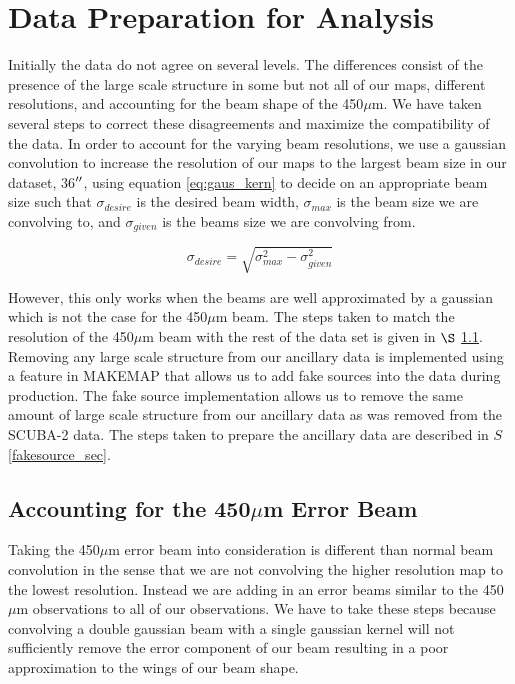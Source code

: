 \section{Data Preparation for Analysis}

Initially the data do not agree on several levels.  The differences consist of the presence of the large scale structure in some but not all of our maps, different resolutions, and accounting for the beam shape of the 450$\mu$m.  We have taken several steps to correct these disagreements and maximize the compatibility of the data.  In order to account for the varying beam resolutions, we use a gaussian convolution to increase the resolution of our maps to the largest beam size in our dataset, 36$\mbox{$^{\prime\prime}$}$, using equation \ref{eq:gaus_kern} to decide on an appropriate beam size such that $\sigma_{desire}$ is the desired beam width, $\sigma_{max}$ is the beam size we are convolving to, and $\sigma_{given}$ is the beams size we are convolving from.

\begin{equation}\label{eq:gaus_kern}
  \sigma_{desire} = \sqrt{\sigma_{max}^2 - \sigma_{given}^2}
\end{equation}

However, this only works when the beams are well approximated by a gaussian which is not the case for the 450$\mu$m beam.  The steps taken to match the resolution of the 450$\mu$m beam with the rest of the data set is given in $\S$ \ref{450_fix_sec}.  Removing any large scale structure from our ancillary data is implemented using a feature in MAKEMAP that allows us to add fake sources into the data during production.  The fake source implementation allows us to remove the same amount of large scale structure from our ancillary data as was removed from the SCUBA-2 data.  The steps taken to prepare the ancillary data are described in $S$\ref{fakesource_sec}.


\subsection{Accounting for the 450$\mu$m Error Beam}\label{450_fix_sec}

Taking the 450$\mu$m error beam into consideration is different than normal beam convolution in the sense that we are not convolving the higher resolution map to the lowest resolution.  Instead we are adding in an error beams similar to the 450$\mu$m observations to all of our observations.  We have to take these steps because convolving a double gaussian beam with a single gaussian kernel will not sufficiently remove the error component of our beam resulting in a poor approximation to the wings of our beam shape.


